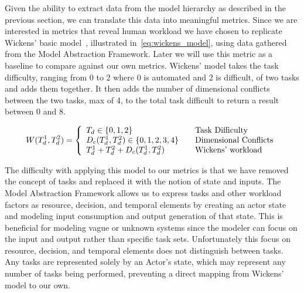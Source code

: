 Given the ability to extract data from the model hierarchy as described in the previous section, we can translate this data into meaningful metrics.  Since we are interested in metrics that reveal human workload we have chosen to replicate Wickens' basic model~\cite{wickens2002multiple}, illustrated in~\ref{eq:wickens_model}, using data gathered from the Model Abstraction Framework.  Later we will use this metric as a baseline to compare against our own metrics.  Wickens' model takes the task difficulty, ranging from 0 to 2 where 0 is automated and 2 is difficult, of two tasks and adds them together.  It then adds the number of dimensional conflicts between the two tasks, max of 4, to the total task difficult to return a result between 0 and 8.

\begin{equation}
W(T_{d}^{1}, T_{d}^{2}) = \left\{ 
  \begin{array}{l l}
    T_{d} \in \{0,1,2\} & \quad \text{Task Difficulty}\\
    D_{c}(T_{d}^{1}, T_{d}^{2})\in \{0,1,2,3,4\} & \quad \text{Dimensional Conflicts}\\
    T_{d}^1 + T_{d}^2 + D_{c}(T_{d}^{1}, T_{d}^{2}) & \quad \text{Wickens' workload}
  \end{array}
  \right.
  \label{eq:wickens_model}
\end{equation}


The difficulty with applying this model to our metrics is that we have removed the concept of tasks and replaced it with the notion of state and inputs.  The Model Abstraction Framework allows us to express tasks and other workload factors as resource, decision, and temporal elements by creating an actor state and modeling input consumption and output generation of that state.  This is beneficial for modeling vague or unknown systems since the modeler can focus on the input and output rather than specific task sets.  Unfortunately this focus on resource, decision, and temporal elements does not distinguish between tasks.  Any tasks are represented solely by an Actor's state, which may represent any number of tasks being performed, preventing a direct mapping from Wickens' model to our own. 


